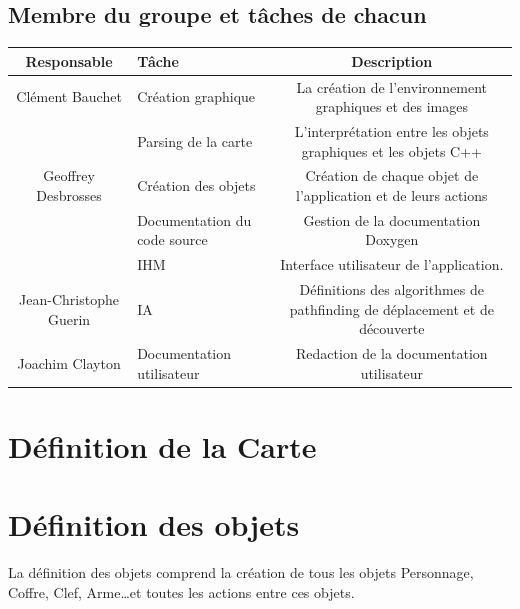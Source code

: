 \documentclass[a4paper 12pts]{article}
\begin{document}
\subsection{Membre du groupe et tâches de chacun}
\vspace{1 cm}



\vspace{1 cm}

\begin{tabular}{| c | p{6cm} | c |}
\hline
\textbf{Responsable} & \textbf{Tâche} & \textbf {Description} \\
\hline
Clément Bauchet & Création graphique & La création de l'environnement graphiques et des images \\					
& Parsing de la carte & L'interprétation entre les objets graphiques et les objets C++\\					
\hline				
Geoffrey Desbrosses & Création des objets & Création de chaque objet de l'application et de leurs actions\\
& Documentation du code source & Gestion de la documentation Doxygen \\ 
\hline
& IHM & Interface utilisateur de l'application. \\
\hline
Jean-Christophe Guerin & IA  & Définitions des algorithmes de pathfinding de déplacement et de découverte\\	
\hline
Joachim Clayton & Documentation utilisateur & Redaction de la documentation utilisateur \\                 
\end{tabular}





\newpage
\section{Définition de la Carte}





\newpage

\section{Définition des objets}
La définition des objets comprend la création de tous les objets Personnage, Coffre, Clef, Arme\ldots et toutes les actions entre ces objets.
\end{document}
